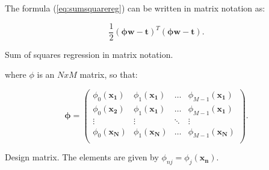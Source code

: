 


\noindent The formula (\ref{eq:sumsquarereg}) can be written in matrix notation as:

\begin{Equation}[H]
	\centering
	\begin{equation} \label{eq:sumsquareregvec}
	    \frac{1}{2} (\bm{\phi} \bm{w} - \bm{t})^T (\bm{\phi} \bm{w} - \bm{t}) .
	\end{equation}
	\caption[Sum of squares regression in matrix notation.]{Sum of squares regression in matrix notation.}
\end{Equation}

\noindent where $\phi$ is an $N x M$ matrix, so that:
 
\begin{Equation}[!htb]
	\centering
	\begin{equation} \label{eq:designmatrix}
	\bm{\phi} =
		\begin{pmatrix}
			\phi_0(\bm{x_1}) & \phi_1(\bm{x_1}) & \dots & \phi_{M-1}(\bm{x_1}) \\
			\phi_0(\bm{x_2}) & \phi_1(\bm{x_1}) & \dots & \phi_{M-1}(\bm{x_1}) \\
			\vdots & \vdots & \ddots & \vdots \\
			\phi_0(\bm{x_N}) & \phi_1(\bm{x_N}) & \dots & \phi_{M-1}(\bm{x_N}) \\
		\end{pmatrix} .
	\end{equation}
	\caption[Design matrix.]{Design matrix. The elements are given by $\phi_{nj} = \phi_j(\bm{x_n})$.}
\end{Equation}

